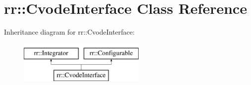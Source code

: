 \hypertarget{classrr_1_1_cvode_interface}{\section{rr\-:\-:Cvode\-Interface Class Reference}
\label{classrr_1_1_cvode_interface}
}
Inheritance diagram for rr\-:\-:Cvode\-Interface\-:\begin{figure}[H]
\begin{center}
\leavevmode
\includegraphics[height=2.000000cm]{classrr_1_1_cvode_interface}
\end{center}
\end{figure}
